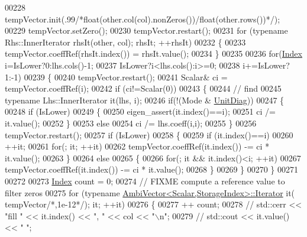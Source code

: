 \begin{DoxyCode}
00228       tempVector.init(.99\textcolor{comment}{/*float(other.col(col).nonZeros())/float(other.rows())*/});
00229       tempVector.setZero();
00230       tempVector.restart();
00231       \textcolor{keywordflow}{for} (\textcolor{keyword}{typename} Rhs::InnerIterator rhsIt(other, col); rhsIt; ++rhsIt)
00232       \{
00233         tempVector.coeffRef(rhsIt.index()) = rhsIt.value();
00234       \}
00235 
00236       \textcolor{keywordflow}{for}(\hyperlink{namespace_eigen_a62e77e0933482dafde8fe197d9a2cfde}{Index} i=IsLower?0:lhs.cols()-1;
00237           IsLower?i<lhs.cols():i>=0;
00238           i+=IsLower?1:-1)
00239       \{
00240         tempVector.restart();
00241         Scalar& ci = tempVector.coeffRef(i);
00242         \textcolor{keywordflow}{if} (ci!=Scalar(0))
00243         \{
00244           \textcolor{comment}{// find}
00245           \textcolor{keyword}{typename} Lhs::InnerIterator it(lhs, i);
00246           \textcolor{keywordflow}{if}(!(Mode & \hyperlink{group__enums_gga39e3366ff5554d731e7dc8bb642f83cdaddb72f888ac85d5a1c52333e54f9374b}{UnitDiag}))
00247           \{
00248             \textcolor{keywordflow}{if} (IsLower)
00249             \{
00250               eigen\_assert(it.index()==i);
00251               ci /= it.value();
00252             \}
00253             \textcolor{keywordflow}{else}
00254               ci /= lhs.coeff(i,i);
00255           \}
00256           tempVector.restart();
00257           \textcolor{keywordflow}{if} (IsLower)
00258           \{
00259             \textcolor{keywordflow}{if} (it.index()==i)
00260               ++it;
00261             \textcolor{keywordflow}{for}(; it; ++it)
00262               tempVector.coeffRef(it.index()) -= ci * it.value();
00263           \}
00264           \textcolor{keywordflow}{else}
00265           \{
00266             \textcolor{keywordflow}{for}(; it && it.index()<i; ++it)
00267               tempVector.coeffRef(it.index()) -= ci * it.value();
00268           \}
00269         \}
00270       \}
00271 
00272 
00273       \hyperlink{namespace_eigen_a62e77e0933482dafde8fe197d9a2cfde}{Index} count = 0;
00274       \textcolor{comment}{// FIXME compute a reference value to filter zeros}
00275       \textcolor{keywordflow}{for} (\textcolor{keyword}{typename} \hyperlink{class_eigen_1_1internal_1_1_ambi_vector_1_1_iterator}{AmbiVector<Scalar,StorageIndex>::Iterator} it(
      tempVector\textcolor{comment}{/*,1e-12*/}); it; ++it)
00276       \{
00277         ++ count;
00278 \textcolor{comment}{//         std::cerr << "fill " << it.index() << ", " << col << "\(\backslash\)n";}
00279 \textcolor{comment}{//         std::cout << it.value() << "  ";}

\end{DoxyCode}
